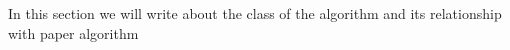 \documentclass[main.tex]{subfiles}
\begin{document}
In this section we will write about the class of the algorithm and its relationship with paper algorithm\\
\end{document}

